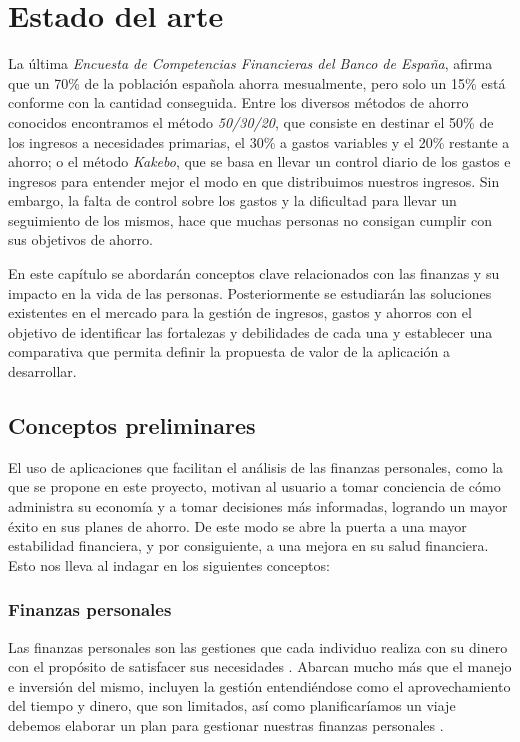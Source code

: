 \chapter{Estado del arte}
La última \textit{Encuesta de Competencias Financieras del Banco de España}, afirma que un 70\% de la población española ahorra mesualmente, pero solo un 15\% está conforme con la cantidad conseguida\cite{encuesta-competencias}. Entre los diversos métodos de ahorro conocidos encontramos el método \textit{50/30/20}, que consiste en destinar el 50\% de los ingresos a necesidades primarias, el 30\% a gastos variables y el 20\% restante a ahorro; o el método \textit{Kakebo}, que se basa en llevar un control diario de los gastos e ingresos para entender mejor el modo en que distribuimos nuestros ingresos\cite{metodos-ahorro}. Sin embargo, la falta de control sobre los gastos y la dificultad para llevar un seguimiento de los mismos, hace que muchas personas no consigan cumplir con sus objetivos de ahorro.

En este capítulo se abordarán conceptos clave relacionados con las finanzas y su impacto en la vida de las personas. Posteriormente se estudiarán las soluciones existentes en el mercado para la gestión de ingresos, gastos y ahorros con el objetivo de identificar las fortalezas y debilidades de cada una y establecer una comparativa que permita definir la propuesta de valor de la aplicación a desarrollar.

\section{Conceptos preliminares}
El uso de aplicaciones que facilitan el análisis de las finanzas personales, como la que se propone en este proyecto, motivan al usuario a tomar conciencia de cómo administra su economía y a tomar decisiones más informadas, logrando un mayor éxito en sus planes de ahorro. De este modo se abre la puerta a una mayor estabilidad financiera, y por consiguiente, a una mejora en su salud financiera. Esto nos lleva al indagar en los siguientes conceptos:

\subsection*{Finanzas personales}
Las finanzas personales son las gestiones que cada individuo realiza con su dinero 
con el propósito de satisfacer sus necesidades \cite{tesis-bienestar-financiero}.
Abarcan mucho más que el manejo e inversión del mismo, incluyen la gestión  
entendiéndose como el aprovechamiento del tiempo y dinero, que son limitados, así 
como planificaríamos un viaje debemos elaborar un plan para gestionar nuestras 
finanzas personales \cite{tyson2023personal}. 

